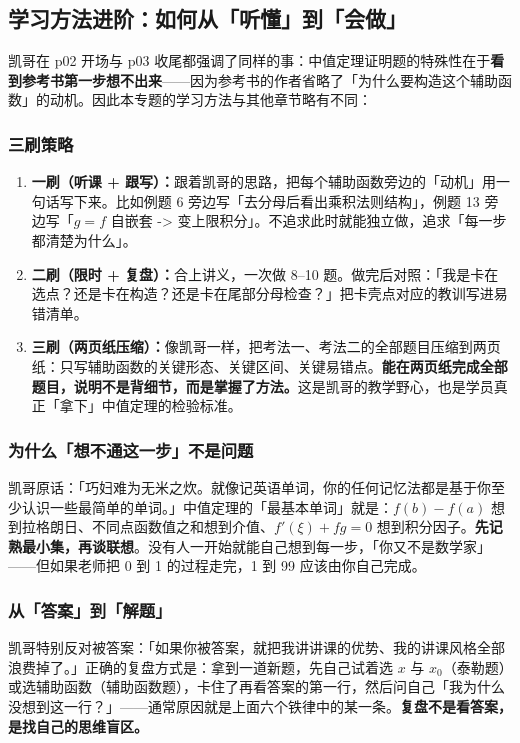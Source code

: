 \documentclass[a4paper]{article}
\begin{document}
\subsection{学习方法进阶：如何从「听懂」到「会做」}

凯哥在 p02 开场与 p03 收尾都强调了同样的事：中值定理证明题的特殊性在于\textbf{看到参考书第一步想不出来}——因为参考书的作者省略了「为什么要构造这个辅助函数」的动机。因此本专题的学习方法与其他章节略有不同：

\subsubsection{三刷策略}

\begin{enumerate}
\item \textbf{一刷（听课 + 跟写）：}跟着凯哥的思路，把每个辅助函数旁边的「动机」用一句话写下来。比如例题 6 旁边写「去分母后看出乘积法则结构」，例题 13 旁边写「$g=f$ 自嵌套 -> 变上限积分」。不追求此时就能独立做，追求「每一步都清楚为什么」。
\item \textbf{二刷（限时 + 复盘）：}合上讲义，一次做 8--10 题。做完后对照：「我是卡在选点？还是卡在构造？还是卡在尾部分母检查？」把卡壳点对应的教训写进易错清单。
\item \textbf{三刷（两页纸压缩）：}像凯哥一样，把考法一、考法二的全部题目压缩到两页纸：只写辅助函数的关键形态、关键区间、关键易错点。\textbf{能在两页纸完成全部题目，说明不是背细节，而是掌握了方法。}这是凯哥的教学野心，也是学员真正「拿下」中值定理的检验标准。
\end{enumerate}

\subsubsection{为什么「想不通这一步」不是问题}

凯哥原话：「巧妇难为无米之炊。就像记英语单词，你的任何记忆法都是基于你至少认识一些最简单的单词。」中值定理的「最基本单词」就是：$f(b)-f(a)$ 想到拉格朗日、不同点函数值之和想到介值、$f'(\xi)+fg=0$ 想到积分因子。\textbf{先记熟最小集，再谈联想}。没有人一开始就能自己想到每一步，「你又不是数学家」——但如果老师把 0 到 1 的过程走完，1 到 99 应该由你自己完成。

\subsubsection{从「答案」到「解题」}

凯哥特别反对被答案：「如果你被答案，就把我讲讲课的优势、我的讲课风格全部浪费掉了。」正确的复盘方式是：拿到一道新题，先自己试着选 $x$ 与 $x_0$（泰勒题）或选辅助函数（辅助函数题），卡住了再看答案的第一行，然后问自己「我为什么没想到这一行？」——通常原因就是上面六个铁律中的某一条。\textbf{复盘不是看答案，是找自己的思维盲区。}
\end{document}
